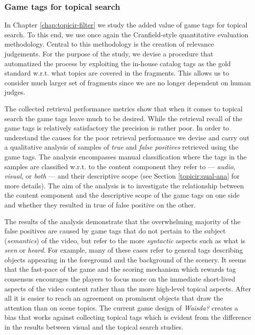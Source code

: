\subsubsection{Game tags for topical search}
In Chapter \ref{chap:topicir-filter} we study the added value of game tags for topical search. To this end, we use once again the Cranfield-style quantitative evaluation methodology. Central to this methodology is the creation of relevance judgements. For the purpose of the study, we devise a procedure that automatized the process by exploiting the in-house catalog tags as the gold standard w.r.t. what topics are covered in the fragments. This allows us to consider much larger set of fragments since we are no longer dependent on human judges. 

The collected retrieval performance metrics show that when it comes to topical search the game tags leave much to be desired. While the retrieval recall of the game tags is relatively satisfactory the precision is rather poor. In order to understand the causes for the  poor retrieval performance we devise and carry out a qualitative analysis of samples of \textit{true} and \textit{false positives} retrieved using the game tags. The analysis encompasses manual classification where the tags in the samples are classified w.r.t. to the content component they refer to --- \textit{audio}, \textit{visual}, or \textit{both} --- and their descriptive scope (see Section \ref{topicir:qual-ana} for more details). The aim of the analysis is to investigate the relationship between the content component and the descriptive scope of the game tags on one side and whether they resulted in true of false positive on the other. 

The results of the analysis demonstrate that the overwhelming majority of the false positives are caused by game tags that do not pertain to the subject (\textit{semantics}) of the video, but refer to the more \textit{syntactic} aspects such as what is \textit{seen} or \textit{heard}. For example, many of these cases refer to general tags describing objects appearing in the foreground and the background of the scenery. It seems that the fast-pace of the game and the scoring mechanism which rewards tag consensus encourages the players to focus more on the immediate short-lived aspects of the video content rather than the more high-level topical aspects. After all it is easier to reach an agreement on prominent objects that draw the attention than on scene topics. The current game design of \textit{Waisda?} creates a bias that works against collecting topical tags which is evident from the difference in the results between visual and the topical search studies. 

